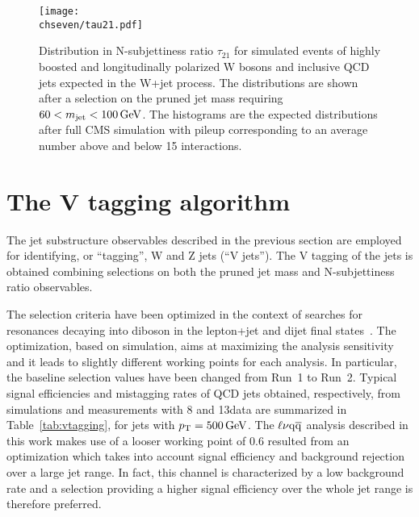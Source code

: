 \begin{figure}[!htb]
 \begin{center}
  \texttt{[image: \\chseven/tau21.pdf]}
 \end{center}
 \caption{\small Distribution in N-subjettiness ratio $\tau_{21}$ for simulated events of highly boosted and longitudinally polarized W bosons and inclusive QCD jets expected in the W+jet process. The distributions are shown after a selection on the pruned jet mass requiring $60 < m_{\text{jet}} < 100\,\text{Ge\hspace{-.08em}V}$. The histograms are the expected distributions after full CMS simulation with pileup corresponding to an average number above and below 15 interactions.
 }
 \label{fig:tau21}
\end{figure}

\section{The V tagging algorithm}
\label{sec:vtagging}

The jet substructure observables described in the previous section are employed for identifying, or ``tagging'', W and Z jets (``V jets''). The V tagging of the jets is obtained combining selections on both the pruned jet mass \mJ and N-subjettiness ratio \nsubj observables. %

The selection criteria have been optimized in the context of searches for resonances decaying into diboson in the lepton+jet and dijet final states~\cite{Khachatryan:2014gha,Khachatryan:2014hpa,CMS-PAS-EXO-15-002}. The optimization, based on simulation, aims at maximizing the analysis sensitivity and it leads to slightly different working points for each analysis. In particular, the baseline selection values have been changed from Run~1 to Run~2. Typical signal efficiencies and mistagging rates of QCD jets obtained, respectively, from simulations and measurements with 8 and 13\TeV data are summarized in Table~\ref{tab:vtagging}, for jets with $p_{\mathrm{T}} = 500\,\text{Ge\hspace{-.08em}V}$.
The $\ell\nu\mathrm{q}\overline{\mathrm{q}}$ analysis described in this work makes use of a looser \nsubj working point of 0.6 resulted from an optimization which takes into account signal efficiency and background rejection over a large jet \pt range.
In fact, this channel is characterized by a low background rate and a \nsubj selection providing a higher signal efficiency over the whole jet \pt range is therefore preferred.\\

